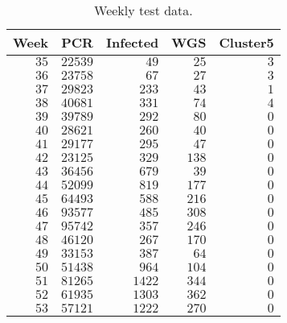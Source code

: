 \begin{table}[!tbp]
\caption{Weekly test data.\label{tab:summary}} 
\begin{center}
\begin{tabular}{rrrrr}
\hline\hline
\multicolumn{1}{c}{Week}&\multicolumn{1}{c}{PCR}&\multicolumn{1}{c}{Infected}&\multicolumn{1}{c}{WGS}&\multicolumn{1}{c}{Cluster5}\tabularnewline
\hline
$35$&$22539$&$  49$&$ 25$&$3$\tabularnewline
$36$&$23758$&$  67$&$ 27$&$3$\tabularnewline
$37$&$29823$&$ 233$&$ 43$&$1$\tabularnewline
$38$&$40681$&$ 331$&$ 74$&$4$\tabularnewline
$39$&$39789$&$ 292$&$ 80$&$0$\tabularnewline
$40$&$28621$&$ 260$&$ 40$&$0$\tabularnewline
$41$&$29177$&$ 295$&$ 47$&$0$\tabularnewline
$42$&$23125$&$ 329$&$138$&$0$\tabularnewline
$43$&$36456$&$ 679$&$ 39$&$0$\tabularnewline
$44$&$52099$&$ 819$&$177$&$0$\tabularnewline
$45$&$64493$&$ 588$&$216$&$0$\tabularnewline
$46$&$93577$&$ 485$&$308$&$0$\tabularnewline
$47$&$95742$&$ 357$&$246$&$0$\tabularnewline
$48$&$46120$&$ 267$&$170$&$0$\tabularnewline
$49$&$33153$&$ 387$&$ 64$&$0$\tabularnewline
$50$&$51438$&$ 964$&$104$&$0$\tabularnewline
$51$&$81265$&$1422$&$344$&$0$\tabularnewline
$52$&$61935$&$1303$&$362$&$0$\tabularnewline
$53$&$57121$&$1222$&$270$&$0$\tabularnewline
\hline
\end{tabular}\end{center}
\end{table}
